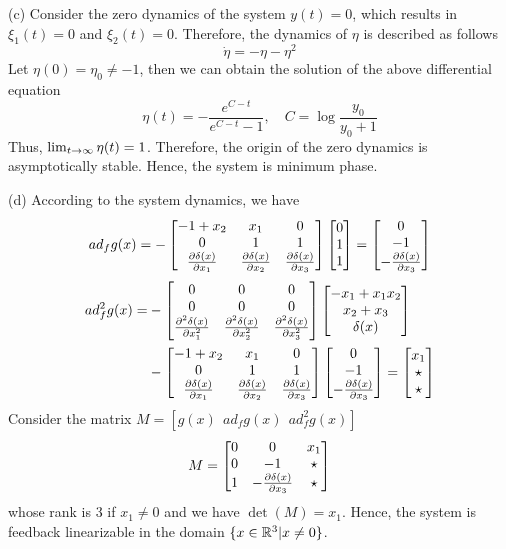 \documentclass[a4 paper, 12pt]{article}
\begin{document}
(c) Consider the zero dynamics of the system $y(t) = 0$, which results in $\xi_1(t)=0$ and $\xi_2(t)=0$. Therefore, the dynamics of $\eta$ is described as follows
\begin{equation}
        \dot\eta = -\eta - \eta^2
\end{equation}
Let $\eta(0) = \eta_0 \neq -1$, then we can obtain the solution of the above differential equation
\begin{equation}
        \eta(t) = -\frac{e^{C-t}}{e^{C-t}-1}, \quad C = \log\frac{y_0}{y_0+1}
\end{equation}
Thus, $\lim_{t\rightarrow\infty}\eta(t) = 1$. Therefore, the origin of the zero dynamics is asymptotically stable. Hence, the system is minimum phase.

(d) According to the system dynamics, we have
\begin{equation}
        ad_fg(x) = -\begin{bmatrix} -1+x_2 &x_1 &0 \\ 0 &1 &1 \\ \frac{\partial{\delta(x)}}{\partial{x_1}} &\frac{\partial{\delta(x)}}{\partial{x_2}} &\frac{\partial{\delta(x)}}{\partial{x_3}} \end{bmatrix} \begin{bmatrix} 0 \\ 1 \\ 1 \end{bmatrix} = \begin{bmatrix} 0 \\ -1 \\ -\frac{\partial{\delta(x)}}{\partial{x_3}} \end{bmatrix}
\end{equation}
\begin{equation}
        \begin{aligned}
                ad_f^2g(x) = &-\begin{bmatrix} 0 &0 &0 \\ 0 &0 &0 \\ \frac{\partial^2{\delta(x)}}{\partial{x_1^2}} &\frac{\partial^2{\delta(x)}}{\partial{x_2^2}} &\frac{\partial^2{\delta(x)}}{\partial{x_3^2}} \end{bmatrix} \begin{bmatrix} -x_1+x_1x_2 \\ x_2+x_3 \\ \delta(x) \end{bmatrix} \\
                 &-\begin{bmatrix} -1+x_2 &x_1 &0 \\ 0 &1 &1 \\ \frac{\partial{\delta(x)}}{\partial{x_1}} &\frac{\partial{\delta(x)}}{\partial{x_2}} &\frac{\partial{\delta(x)}}{\partial{x_3}} \end{bmatrix} \begin{bmatrix} 0 \\ -1 \\ -\frac{\partial{\delta(x)}}{\partial{x_3}}  \end{bmatrix} 
                 = \begin{bmatrix} x_1 \\ \star \\ \star \end{bmatrix}
        \end{aligned}
\end{equation}
Consider the matrix $M = [g(x) ~~ad_fg(x) ~~ad_f^2g(x)]$
\begin{equation}
        M = \begin{bmatrix} 0 &0 &x_1 \\ 0 &-1 &\star \\ 1 &-\frac{\partial{\delta(x)}}{\partial{x_3}} &\star \end{bmatrix}
\end{equation}
whose rank is 3 if $x_1\neq0$ and we have $\det{(M)}=x_1$. Hence, the system is feedback linearizable in the domain $\{ x\in\mathbb{R}^3 | x\neq0 \}$.
\end{document}
